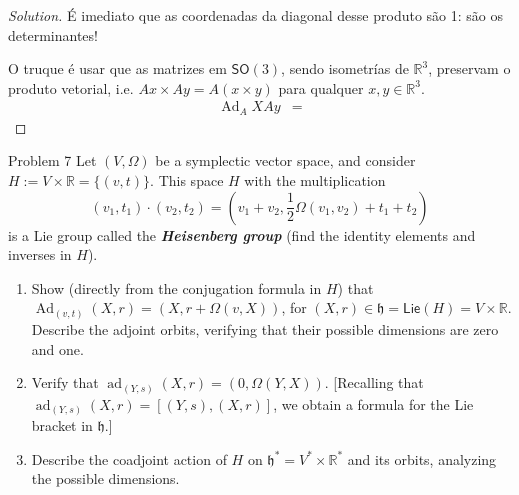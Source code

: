 \begin{proof}[Solution]
É imediato que as coordenadas da diagonal desse produto são 1: são os determinantes!

O truque é usar que as matrizes em $\mathsf{SO}(3)$, sendo isometrías de $\mathbb{R}^{3}$, preservam o produto vetorial, i.e. $Ax\times Ay=A(x \times y)$ para qualquer $x,y\in\mathbb{R}^{3}$.
\begin{align*}
	\operatorname{Ad}_AXAy&=
\end{align*}
\end{proof}

\begin{thing1}{Problem 7}\leavevmode
	Let $(V,\Omega)$ be a symplectic vector space, and consider $H:=V\times \mathbb{R}=\{(v,t)\}$. This space $H$ with the multiplication
	\[(v_1,t_1)\cdot(v_2,t_2)=\left( v_1+v_2,\frac{1}{2}\Omega(v_1,v_2)+t_1+t_2 \right) \]
	is a Lie group called the \textit{\textbf{Heisenberg group}} (find the identity elements and inverses in  $H$).
	\begin{enumerate}[label=\alph*.]
		\item Show (directly from the conjugation formula in $H$) that $\operatorname{Ad}_{(v,t)}(X,r)=(X,r+\Omega(v,X))$, for $(X,r)\in\mathfrak{h}=\mathsf{Lie}(H) =V\times \mathbb{R}$. Describe the adjoint orbits, verifying that their possible dimensions are zero and one.
		\item Verify that $\operatorname{ad}_{(Y,s)}(X,r)=(0,\Omega(Y,X))$. [Recalling that $\operatorname{ad}_{(Y,s)}(X,r)=[(Y,s),(X,r)]$, we obtain a formula for the Lie bracket in $ \mathfrak{h}$.]
		\item Describe the coadjoint action of $H$ on $\mathfrak{h}^*=V^*\times \mathbb{R}^*$ and its orbits, analyzing the possible dimensions.
	\end{enumerate}
\end{thing1}

